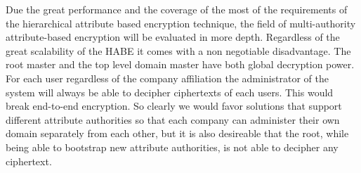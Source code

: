 Due the great performance and the coverage of the most of the requirements of the hierarchical attribute based encryption technique, the field of multi-authority attribute-based encryption will be evaluated in more depth. Regardless of the great scalability of the \ac{HABE} it comes with a non negotiable disadvantage. The root master and the top level domain master have both global decryption power. For each user regardless of the company affiliation the administrator of the system will always be able to decipher ciphertexts of each users. This would break end-to-end encryption. So clearly we would favor solutions that support different attribute authorities so that each company can administer their own domain separately from each other, but it is also desireable that the root, while being able to bootstrap new attribute authorities, is not able to decipher any ciphertext. 